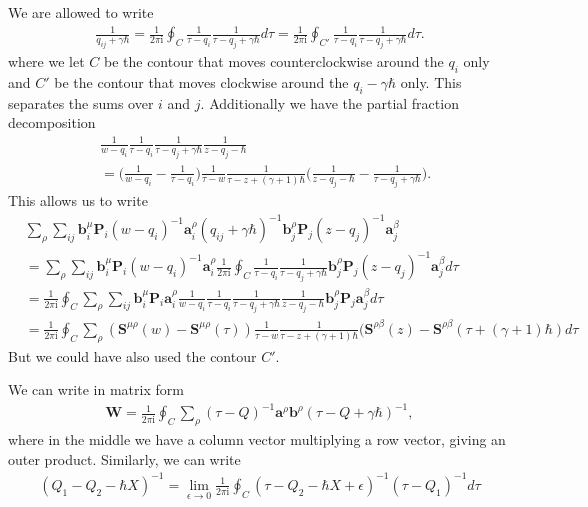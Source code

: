 \documentclass[11pt]{report}
\theoremstyle{definition}
\theoremstyle{remark}
\theoremstyle{remark}
\newcommand{\I}{\mathrm{i}}
\begin{document}
We are allowed to write
\begin{align*}
\frac{1}{q_{ij}+\gamma\hbar} = \frac{1}{2\pi\I}\oint_C \frac{1}{\tau-q_i} \frac{1}{\tau-q_j+\gamma\hbar} d\tau = \frac{1}{2\pi\I} \oint_{C'} \frac{1}{\tau-q_i} \frac{1}{\tau-q_j+\gamma\hbar} d\tau.
\end{align*}
where we let $C$ be the contour that moves counterclockwise around the $q_i$ only and $C'$ be the contour that moves clockwise around the $q_i-\gamma\hbar$ only. This separates the sums over $i$ and $j$. Additionally we have the partial fraction decomposition
\begin{align*}
&\frac{1}{w-q_i} \frac{1}{\tau-q_i} \frac{1}{\tau-q_j+\gamma\hbar} \frac{1}{z-q_j-\hbar} \\
&= \bigg( \frac{1}{w-q_i} - \frac{1}{\tau-q_i} \bigg) \frac{1}{\tau-w} \frac{1}{\tau-z+(\gamma+1)\hbar} \bigg( \frac{1}{z-q_j-\hbar} - \frac{1}{\tau-q_j+\gamma\hbar} \bigg).
\end{align*}
This allows us to write
\begin{align*}
&\sum_\rho \sum_{ij} \mathbf{b}_i^\mu \mathbf{P}_i (w-q_i)^{-1} \mathbf{a}_i^\rho (q_{ij}+\gamma\hbar)^{-1} \mathbf{b}_j^\rho \mathbf{P}_j (z-q_j)^{-1} \mathbf{a}_j^\beta \\
&= \sum_\rho \sum_{ij} \mathbf{b}_i^\mu \mathbf{P}_i (w-q_i)^{-1} \mathbf{a}_i^\rho \frac{1}{2\pi\I} \oint_C \frac{1}{\tau-q_i} \frac{1}{\tau-q_j+\gamma\hbar} \mathbf{b}_j^\rho \mathbf{P}_j (z-q_j)^{-1} \mathbf{a}_j^\beta d\tau \\
&= \frac{1}{2\pi\I} \oint_C \sum_\rho \sum_{ij} \mathbf{b}_i^\mu \mathbf{P}_i \mathbf{a}_i^\rho \frac{1}{w-q_i} \frac{1}{\tau-q_i} \frac{1}{\tau-q_j+\gamma\hbar} \frac{1}{z-q_j-\hbar} \mathbf{b}_j^\rho \mathbf{P}_j \mathbf{a}_j^\beta d\tau \\
&= \frac{1}{2\pi\I} \oint_C \sum_\rho (\mathbf{S}^{\mu\rho}(w)-\mathbf{S}^{\mu\rho}(\tau)) \frac{1}{\tau-w} \frac{1}{\tau-z+(\gamma+1)\hbar} (\mathbf{S}^{\rho\beta}(z) - \mathbf{S}^{\rho\beta}(\tau+(\gamma+1)\hbar) d\tau
\end{align*}
But we could have also used the contour $C'$.

We can write in matrix form
\begin{align*}
\mathbf{W} = \frac{1}{2\pi\I} \oint_C \sum_\rho (\tau-Q)^{-1} \mathbf{a}^\rho \mathbf{b}^\rho (\tau-Q+\gamma\hbar)^{-1},
\end{align*}
where in the middle we have a column vector multiplying a row vector, giving an outer product. Similarly, we can write
\begin{align*}
(Q_1-Q_2-\hbar X)^{-1} = \lim_{\epsilon\to 0} \frac{1}{2\pi\I} \oint_C (\tau - Q_2 - \hbar X + \epsilon)^{-1} (\tau-Q_1)^{-1} d\tau
\end{align*}
\end{document}

